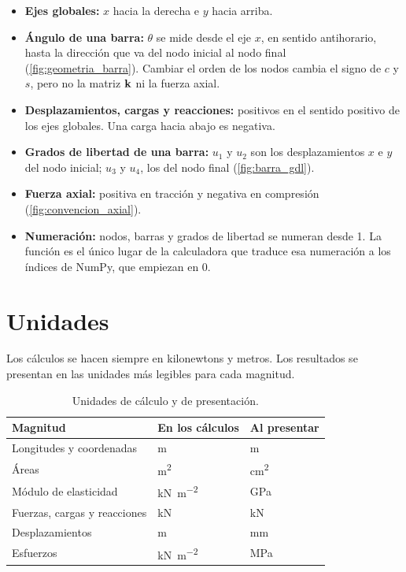 \begin{itemize}
  \item \textbf{Ejes globales:} $x$ hacia la derecha e $y$ hacia arriba.
  \item \textbf{Ángulo de una barra:} $\theta$ se mide desde el eje $x$, en
    sentido antihorario, hasta la dirección que va del nodo inicial al nodo
    final (\cref{fig:geometria_barra}). Cambiar el orden de los nodos cambia
    el signo de $c$ y $s$, pero no la matriz $\mathbf{k}$ ni la fuerza axial.
  \item \textbf{Desplazamientos, cargas y reacciones:} positivos en el sentido
    positivo de los ejes globales. Una carga hacia abajo es negativa.
  \item \textbf{Grados de libertad de una barra:} $u_1$ y $u_2$ son los
    desplazamientos $x$ e $y$ del nodo inicial; $u_3$ y $u_4$, los del nodo
    final (\cref{fig:barra_gdl}).
  \item \textbf{Fuerza axial:} positiva en tracción y negativa en compresión
    (\cref{fig:convencion_axial}).
  \item \textbf{Numeración:} nodos, barras y grados de libertad se numeran
    desde 1. La función  es el único lugar de la calculadora que
    traduce esa numeración a los índices de NumPy, que empiezan en 0.
\end{itemize}

\section{Unidades}\label{sec:e_unidades}

Los cálculos se hacen siempre en kilonewtons y metros. Los resultados se
presentan en las unidades más legibles para cada magnitud.

\begin{table}[ht]
  \centering
  \caption{Unidades de cálculo y de presentación.}
  \label{tab:e_unidades}
  \small
  \begin{tabular}{@{}lll@{}}
    \toprule
    Magnitud & En los cálculos & Al presentar \\
    \midrule
    Longitudes y coordenadas & \si{\metre} & \si{\metre} \\
    Áreas & \si{\metre\squared} & \si{\centi\metre\squared} \\
    Módulo de elasticidad & \si{\kilo\newton\per\metre\squared} & \si{\giga\pascal} \\
    Fuerzas, cargas y reacciones & \si{\kilo\newton} & \si{\kilo\newton} \\
    Desplazamientos & \si{\metre} & \si{\milli\metre} \\
    Esfuerzos & \si{\kilo\newton\per\metre\squared} & \si{\mega\pascal} \\
    \bottomrule
  \end{tabular}
\end{table}


